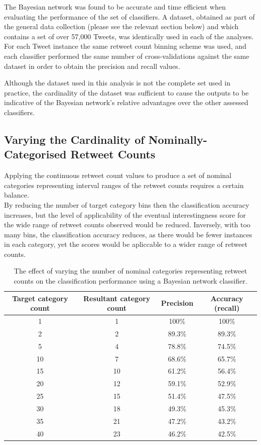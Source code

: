 The Bayesian network was found to be accurate and time efficient when evaluating the performance of the set of classifiers. A dataset, obtained as part of the general data collection (please see the relevant section below) and which contains a set of over 57,000 Tweets, was identically used in each of the analyses. For each Tweet instance the same retweet count binning scheme was used, and each classifier performed the same number of cross-validations against the same dataset in order to obtain the precision and recall values.

Although the dataset used in this analysis is not the complete set used in practice, the cardinality of the dataset was sufficient to cause the outputs to be indicative of the Bayesian network's relative advantages over the other assessed classifiers.


\subsection{Varying the Cardinality of Nominally-Categorised Retweet Counts}
Applying the continuous retweet count values to produce a set of nominal categories representing interval ranges of the retweet counts requires a certain balance.\\
By reducing the number of target category bins then the classification accuracy increases, but the level of applicability of the eventual interestingness score for the wide range of retweet counts observed would be reduced. Inversely, with too many bins, the classification accuracy reduces, as there would be fewer instances in each category, yet the scores would be apliccable to a wider range of retweet counts.

\begin{table}[h]\footnotesize
\begin{center}
\begin{tabular}{ c | c | c | c }
	Target category count	& Resultant category count & Precision &  Accuracy (recall) \\
	\hline
	\hline 
    1 & 1 & 100\% & 100\% \\
    2 & 2 & 89.3\% & 89.3\% \\
    5 & 4 & 78.8\%  & 74.5\% \\
    10 & 7 & 68.6\% & 65.7\% \\
    15 & 10 & 61.2\% & 56.4\% \\
    20 & 12 & 59.1\% & 52.9\% \\
    25 & 15 & 51.4\% & 47.5\% \\
    30 & 18 & 49.3\% & 45.3\% \\
    35 & 21 & 47.2\% & 43.2\% \\
    40 & 23 & 46.2\% & 42.5\% \\
    \hline  
\end{tabular}
\end{center}
\caption{The effect of varying the number of nominal categories representing retweet counts on the classification performance using a Bayesian network classifier.}
\label{table:binperformance}
\end{table}


